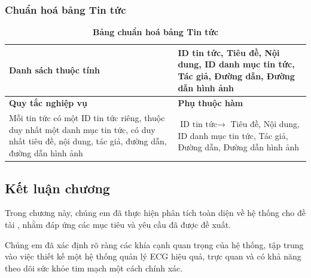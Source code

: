 \subsubsection{Chuẩn hoá bảng Tin tức}
\mbox{}

\begin{table}[H]
  \caption{\bfseries \fontsize{12pt}{0pt}\selectfont Bảng chuẩn hoá bảng Tin tức}
  \centering
  \begin{tabularx}{0.9\textwidth}{|X|X|}
    \hline
    \textbf{Danh sách thuộc tính} & ID tin tức, Tiêu đề, Nội dung, ID danh mục tin tức, Tác giả, Đường dẫn,
    Đường dẫn hình ảnh \\
    \hline
    \textbf{Quy tắc nghiệp vụ} & \textbf{Phụ thuộc hàm} \\
    \hline
    Mỗi tin tức có một ID tin tức riêng, thuộc duy nhất một danh mục tin tức, có duy nhất tiêu đề, 
    nội dung, tác giả, đường dẫn, đường dẫn hình ảnh
    & \parbox[t]{\linewidth}{$\text{ID tin tức} \rightarrow$ Tiêu đề, Nội dung, ID danh mục tin tức, Tác giả, 
    Đường dẫn, Đường dẫn hình ảnh} \\
    \hline
     \\
     \\
    \hline
  \end{tabularx}
\end{table}

\subsection{Kết luận chương}

Trong chương này, chúng em đã thực hiện phân tích toàn diện về
 hệ thống cho đề tài , nhằm đáp ứng
  các mục tiêu và yêu cầu đã được đề xuất.

Chúng em đã xác định rõ ràng các khía cạnh quan trọng của hệ thống,
 tập trung vào việc thiết kế một hệ thống quản lý ECG hiệu quả,
  trực quan và có khả năng theo dõi sức khỏe tim mạch một cách
   chính xác. 


\newpage
